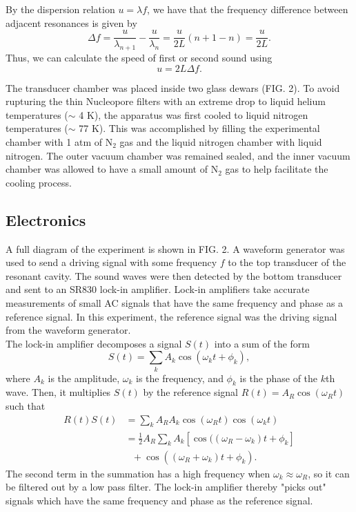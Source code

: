 \documentclass[prb,aps,twocolumn,showpacs,10pt]{revtex4-1}
\begin{document}
\noindent By the dispersion relation $u = \lambda f$, we have that the frequency difference between adjacent resonances is given by
\begin{equation}
\Delta f = \frac{u}{\lambda_{n+1}} - \frac{u}{\lambda_n} = \frac{u}{2L}( n+1-n )= \frac{u}{2L}.
\end{equation}
Thus, we can calculate the speed of first or second sound using
\begin{equation}
u = 2L\Delta f.
\end{equation}

The transducer chamber was placed inside two glass dewars (FIG. 2). To avoid rupturing the thin Nucleopore filters with an extreme drop to liquid helium temperatures ($\sim$ 4 K), the apparatus was first cooled to liquid nitrogen temperatures ($\sim$ 77 K). This was accomplished by filling the experimental chamber with 1 atm of N$_2$ gas and the liquid nitrogen chamber with liquid nitrogen. The outer vacuum chamber was remained sealed, and the inner vacuum chamber was allowed to have a small amount of N$_2$ gas to help facilitate the cooling process. 

\subsection{Electronics}

A full diagram of the experiment is shown in FIG. 2. A waveform generator was used to send a driving signal with some frequency $f$ to the top transducer of the resonant cavity. The sound waves were then detected by the bottom transducer and sent to an SR830 lock-in amplifier. Lock-in amplifiers take accurate measurements of small AC signals that have the same frequency and phase as a reference signal. In this experiment, the reference signal was the driving signal from the waveform generator.\\

The lock-in amplifier decomposes a signal $S(t)$ into a sum of the form
\begin{equation}
S(t) = \sum_k A_k \cos(\omega_k t + \phi_k),
\end{equation}
where $A_k$ is the amplitude, $\omega_k$ is the frequency, and $\phi_k$ is the phase of the $k$th wave. Then, it multiplies $S(t)$ by the reference signal $R(t)=A_R\cos(\omega_R t)$ such that
\begin{align*}
R(t)S(t)&=\sum_k A_R A_k \cos(\omega_R t) \cos(\omega_k t)\\
&=\frac{1}{2} A_R \sum_k A_k [\cos((\omega_R-\omega_k)t+\phi_k]\\
& \ \ \ + \cos((\omega_R+\omega_k)t+\phi_k).
\end{align*}
The second term in the summation has a high frequency when $\omega_k \approx \omega_R$, so it can be filtered out by a low pass filter. The lock-in amplifier thereby "picks out" signals which have the same frequency and phase as the reference signal. \\
\end{document}
